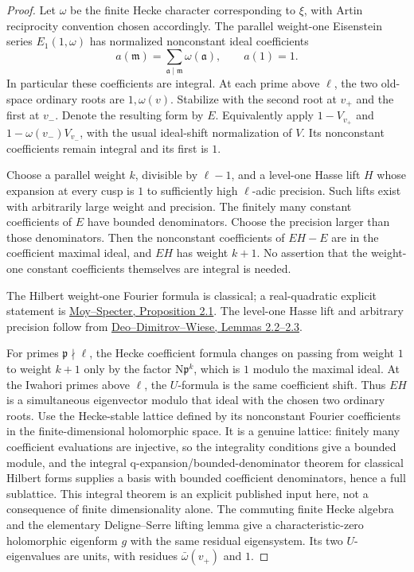 \begin{proof}
Let \(\omega\) be the finite Hecke character corresponding to
\(\xi\), with Artin reciprocity convention chosen accordingly.
The parallel weight-one Eisenstein series \(E_1(1,\omega)\)
has normalized nonconstant ideal coefficients
\[
 a(\mathfrak m)=\sum_{\mathfrak a\mid\mathfrak m}
                         \omega(\mathfrak a),\qquad a(1)=1.
\]
In particular these coefficients are integral.
At each prime above \(\ell\), the two old-space ordinary roots
are \(1,\omega(v)\).
Stabilize with the second root at \(v_+\) and the first at
\(v_-\). Denote the resulting form by \(E\).
Equivalently apply \(1-V_{v_+}\) and
\(1-\omega(v_-)V_{v_-}\), with the usual ideal-shift
normalization of \(V\).
Its nonconstant coefficients remain integral and its first is
\(1\).

Choose a parallel weight \(k\), divisible by \(\ell-1\), and
a level-one Hasse lift \(H\) whose expansion at every cusp is
\(1\) to sufficiently high \(\ell\)-adic precision.
Such lifts exist with arbitrarily large weight and precision.
The finitely many constant coefficients of \(E\) have bounded
denominators. Choose the precision larger than those denominators.
Then the nonconstant coefficients of \(EH-E\) are in the
coefficient maximal ideal, and \(EH\) has weight \(k+1\).
No assertion that the weight-one constant coefficients themselves
are integral is needed.

The Hilbert weight-one Fourier formula is classical; a
real-quadratic explicit statement is
\href{https://webpages.leeu.edu/rmoy/files/2018/08/noncm.pdf}
{Moy--Specter, Proposition 2.1}.
The level-one Hasse lift and arbitrary precision follow from
\href{https://arxiv.org/pdf/1911.11196}
{Deo--Dimitrov--Wiese, Lemmas 2.2--2.3}.

For primes \(\mathfrak p\nmid\ell\), the Hecke coefficient
formula changes on passing from weight \(1\) to weight \(k+1\)
only by the factor \(\mathrm N\mathfrak p^k\), which is \(1\)
modulo the maximal ideal. At the Iwahori primes above \(\ell\),
the \(U\)-formula is the same coefficient shift.
Thus \(EH\) is a simultaneous eigenvector modulo that ideal
with the chosen two ordinary roots.
Use the Hecke-stable lattice defined by its nonconstant Fourier
coefficients in the finite-dimensional holomorphic space.
It is a genuine lattice: finitely many coefficient evaluations
are injective, so the integrality conditions give a bounded
module, and the integral q-expansion/bounded-denominator theorem for
classical Hilbert forms supplies a basis with bounded coefficient
denominators, hence a full sublattice. This integral theorem is
an explicit published input here, not a consequence of finite
dimensionality alone.
The commuting finite Hecke algebra and the elementary
Deligne--Serre lifting lemma give a characteristic-zero
holomorphic eigenform \(g\) with the same residual eigensystem.
Its two \(U\)-eigenvalues are units, with residues
\(\bar\omega(v_+)\) and \(1\).


\end{proof}
